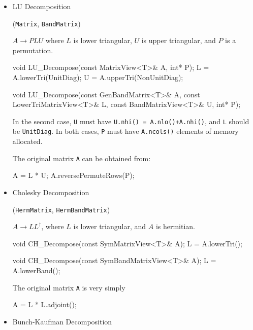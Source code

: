 \documentclass[twoside,letterpaper,11pt]{article}
\renewcommand{\tt}[1]{{\lstinline {#1}}}
\begin{document}
\begin{itemize}

\item LU Decomposition 

(\tt{Matrix}, \tt{BandMatrix})

$A \rightarrow P L U$ where $L$ is lower triangular, 
$U$ is upper triangular, and $P$ is a permutation.

\begin{tmvcode}
void LU_Decompose(const MatrixView<T>& A, int* P);
L = A.lowerTri(UnitDiag);
U = A.upperTri(NonUnitDiag);

void LU_Decompose(const GenBandMatrix<T>& A, 
      const LowerTriMatrixView<T>& L, 
      const BandMatrixView<T>& U, int* P);
\end{tmvcode}
In the second case, \tt{U} must have \tt{U.nhi() = A.nlo()+A.nhi()},
and \tt{L} should be \tt{UnitDiag}.
In both cases, \tt{P} must have \tt{A.ncols()} elements of memory allocated.

The original matrix \tt{A} can be obtained from:
\begin{tmvcode}
A = L * U;
A.reversePermuteRows(P);
\end{tmvcode}

\item Cholesky Decomposition 

(\tt{HermMatrix}, \tt{HermBandMatrix})

$A \rightarrow L L^\dagger$, where $L$ is lower triangular,
and $A$ is hermitian.

\begin{tmvcode}
void CH_Decompose(const SymMatrixView<T>& A);
L = A.lowerTri();

void CH_Decompose(const SymBandMatrixView<T>& A);
L = A.lowerBand();
\end{tmvcode}

The original matrix \tt{A} is very simply
\begin{tmvcode}
A = L * L.adjoint();
\end{tmvcode}

\item Bunch-Kaufman Decomposition 


\end{itemize}
\end{document}
